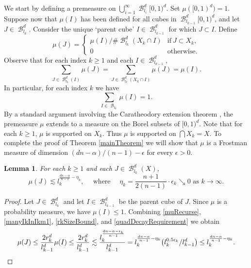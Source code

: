 \documentclass[dvipsnames,letterpaper,12pt]{article}
\numberwithin{equation}{section}
\theoremstyle{plain}
\newtheorem{lemma}{Lemma}
\theoremstyle{remark}
\DeclareMathOperator{\B}{\mathcal{B}}
\begin{document}
We start by defining a premeasure on $\bigcup_{i = 1}^\infty \B^d_{l_i}[0,1)^d$. Set $\mu([0,1)^d) = 1$. Suppose now that $\mu(I)$ has been defined for all cubes in $\B^d_{l_{k-1}}[0,1)^d$, and let $J \in \B^d_{l_k}$. Consider the unique `parent cube' $I \in \B^d_{l_{k-1}}$ for which $J \subset I$. Define
%
\begin{equation} \label{muRecurse} 
	\mu(J) = \begin{cases} {\mu(I)}/{\# \B^d_{l_k}(X_k \cap I)} & \textrm{if}\ J \subset X_k,\\
0 & \textrm{otherwise}.
\end{cases}
\end{equation}
Observe that for each index $k\geq 1$ and each $I \in \B_{l_{k-1}}^d$, 
%
\begin{equation}\label{muBreakDown}
	\sum_{J \in \B_{l_k}^d(I)} \mu(J) = \sum_{J \in \B_{l_k}^d(X_k\cap I)} \mu(J) = \mu(I).
\end{equation}
In particular, for each index $k$ we have
%
\[ \sum_{I\in\B_{l_k}}\mu(I)=1. \]
%
By a standard argument involving the Caratheodory extension theorem \cite[Proposition 1.7]{Falconer}, the premeasure $\mu$ extends to a measure on the Borel subsets of $[0,1)^d$. Note that for each $k \geq 1$, $\mu$ is supported on $X_k$. Thus $\mu$ is supported on $\bigcap X_k = X$. To complete the proof of Theorem \ref{mainTheorem} we will show that $\mu$ is a Frostman measure of dimension $(dn - \alpha)/(n - 1)-\epsilon$ for every $\epsilon>0$. 



\begin{lemma}\label{massSomeScales}
	For each $k \geq 1$ and each $J \in \B^d_{l_k}(X)$, 
	\[ \mu(J) \lesssim l_k^{\frac{dn-\alpha}{n-1}- \eta_k}, \quad \text{ where } \quad \eta_k = \frac{n+1}{2(n-1)} \cdot \epsilon_k \searrow 0 \text{ as } k \rightarrow \infty. \]
\end{lemma}
\begin{proof}
	Let $J \in \B^d_{l_k}$ and let $I \in \B^d_{l_{k-1}}$ be the parent cube of $J$. Since $\mu$ is a probability measure, we have $\mu(I) \leq 1$. Combining \eqref{muRecurse}, \eqref{manyIkInIkm1}, \eqref{rkSizeBound}, and \eqref{quadDecayRequirement} we obtain
	\[ \mu(J)\leq \frac{2r_k^d}{l_{k-1}^d}\mu(I)\leq \frac{2r_k^d}{l_{k-1}^d}\lesssim \frac{l_{k}^{\frac{dn-\alpha - \epsilon_k}{n-1}}}{l_{k-1}^d}=l_k^{\frac{dn-\alpha}{n-1}-\eta_k}\big(l_k^{0.5 \epsilon_k}/l_{k-1}^d\big)\leq l_k^{\frac{dn-\alpha}{n-1}-\eta_k}.\qedhere \]
\end{proof}
\end{document}
